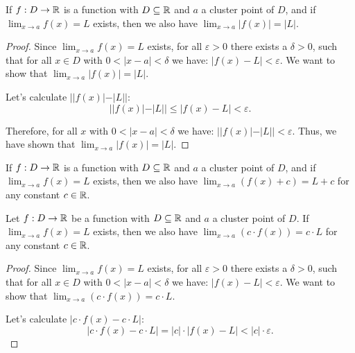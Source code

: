 \begin{corollary}
  If $f: D \to \mathbb{R}$ is a function with $D \subseteq \mathbb{R}$ and $a$ a cluster point of $D$, and if $\lim_{x \to a} f(x) = L$ exists, then we also have $\lim_{x \to a} |f(x)| = |L|$.
\end{corollary}

\begin{proof}
  Since $\lim_{x \to a} f(x) = L$ exists, for all $\varepsilon > 0$ there exists a $\delta > 0$, such that for all $x \in D$ with $0 < |x - a| < \delta$ we have: $|f(x) - L| < \varepsilon$. We want to show that $\lim_{x \to a} |f(x)| = |L|$.

  Let's calculate $||f(x)| - |L||$:
  \[
    ||f(x)| - |L|| \leq |f(x) - L| < \varepsilon.
  \]

  Therefore, for all $x$ with $0 < |x - a| < \delta$ we have: $||f(x)| - |L|| < \varepsilon$. Thus, we have shown that $\lim_{x \to a} |f(x)| = |L|$.
\end{proof}

\begin{fact}
  If $f: D \to \mathbb{R}$ is a function with $D \subseteq \mathbb{R}$ and $a$ a cluster point of $D$, and if $\lim_{x \to a} f(x) = L$ exists, then we also have $\lim_{x \to a} (f(x) + c) = L + c$ for any constant $c \in \mathbb{R}$.
\end{fact}

\begin{theorem}
  Let $f: D \to \mathbb{R}$ be a function with $D \subseteq \mathbb{R}$ and $a$ a cluster point of $D$. If $\lim_{x \to a} f(x) = L$ exists, then we also have $\lim_{x \to a} (c \cdot f(x)) = c \cdot L$ for any constant $c \in \mathbb{R}$.
\end{theorem}

\begin{proof}
  Since $\lim_{x \to a} f(x) = L$ exists, for all $\varepsilon > 0$ there exists a $\delta > 0$, such that for all $x \in D$ with $0 < |x - a| < \delta$ we have: $|f(x) - L| < \varepsilon$. We want to show that $\lim_{x \to a} (c \cdot f(x)) = c \cdot L$.

  Let's calculate $|c \cdot f(x) - c \cdot L|$:
  \[
    |c \cdot f(x) - c \cdot L| = |c| \cdot |f(x) - L| < |c| \cdot \varepsilon.
  \]
\end{proof}